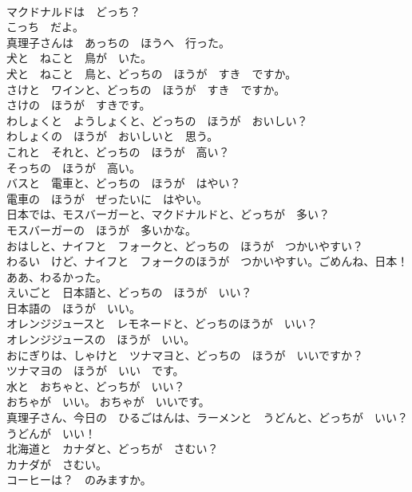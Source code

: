 \documentclass[8pt]{extreport}
\begin{document}
\begin{CJK}{UTF8}{min}
\\	マクドナルドは　どっち？	
\\	こっち　だよ。	
\\	真理子さんは　あっちの　ほうへ　行った。	
\\	犬と　ねこと　鳥が　いた。	
\\	犬と　ねこと　鳥と、どっちの　ほうが　すき　ですか。	
\\	さけと　ワインと、どっちの　ほうが　すき　ですか。	
\\	さけの　ほうが　すきです。	
\\	わしょくと　ようしょくと、どっちの　ほうが　おいしい？	
\\	わしょくの　ほうが　おいしいと　思う。	
\\	これと　それと、どっちの　ほうが　高い？	
\\	そっちの　ほうが　高い。	
\\	バスと　電車と、どっちの　ほうが　はやい？	
\\	電車の　ほうが　ぜったいに　はやい。	
\\	日本では、モスバーガーと、マクドナルドと、どっちが　多い？	
\\	モスバーガーの　ほうが　多いかな。	
\\	おはしと、ナイフと　フォークと、どっちの　ほうが　つかいやすい？	
\\	わるい　けど、ナイフと　フォークのほうが　つかいやすい。ごめんね、日本！	
\\	ああ、わるかった。	
\\	えいごと　日本語と、どっちの　ほうが　いい？	
\\	日本語の　ほうが　いい。	
\\	オレンジジュースと　レモネードと、どっちのほうが　いい？	
\\	オレンジジュースの　ほうが　いい。	
\\	おにぎりは、しゃけと　ツナマヨと、どっちの　ほうが　いいですか？	
\\	ツナマヨの　ほうが　いい　です。	
\\	水と　おちゃと、どっちが　いい？	
\\	おちゃが　いい。 おちゃが　いいです。	
\\	真理子さん、今日の　ひるごはんは、ラーメンと　うどんと、どっちが　いい？	
\\	うどんが　いい！	
\\	北海道と　カナダと、どっちが　さむい？	
\\	カナダが　さむい。	
\\	コーヒーは？　のみますか。	

\end{CJK}
\end{document}
